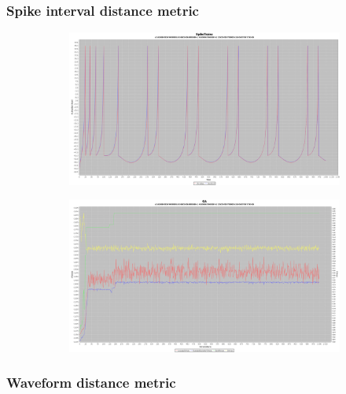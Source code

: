 \documentclass[12pt]{article}
\begin{document}
		\subsubsection{Spike interval distance metric}
			\begin{figure}[H]
				\centering
					\begin{subfigure}{.5\textwidth}
						\centering
						\includegraphics[width=\linewidth]{./../images/izzy2/interval/plot.png}
						
						\label{fig:sub5a}
					\end{subfigure}%
					\begin{subfigure}{.5\textwidth}
						\centering
						\includegraphics[width=\linewidth]{./../images/izzy2/interval/prog.png}
						
						\label{fig:sub5b}
					\end{subfigure}
					
					\label{fig:plot5}
			\end{figure}
			
		\subsubsection{Waveform distance metric}
		
\end{document}
